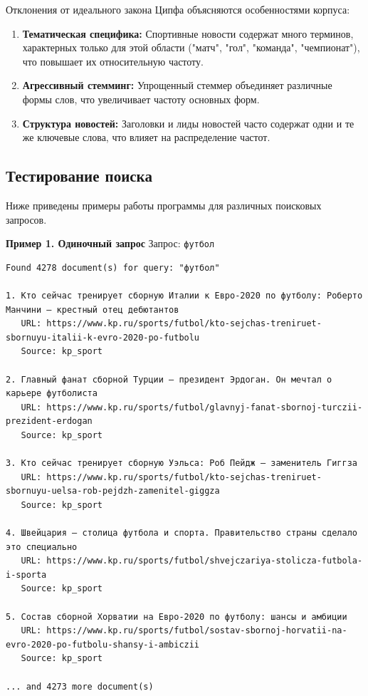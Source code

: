 Отклонения от идеального закона Ципфа объясняются особенностями корпуса:
\begin{enumerate}
    \item \textbf{Тематическая специфика:} Спортивные новости содержат много терминов, характерных только для этой области ("матч", "гол", "команда", "чемпионат"), что повышает их относительную частоту.
    \item \textbf{Агрессивный стемминг:} Упрощенный стеммер объединяет различные формы слов, что увеличивает частоту основных форм.
    \item \textbf{Структура новостей:} Заголовки и лиды новостей часто содержат одни и те же ключевые слова, что влияет на распределение частот.
\end{enumerate}

\subsection{Тестирование поиска}
Ниже приведены примеры работы программы для различных поисковых запросов.

\textbf{Пример 1. Одиночный запрос}
Запрос: \texttt{футбол}
\begin{verbatim}
Found 4278 document(s) for query: "футбол"

1. Кто сейчас тренирует сборную Италии к Евро-2020 по футболу: Роберто Манчини — крестный отец дебютантов
   URL: https://www.kp.ru/sports/futbol/kto-sejchas-treniruet-sbornuyu-italii-k-evro-2020-po-futbolu
   Source: kp_sport

2. Главный фанат сборной Турции – президент Эрдоган. Он мечтал о карьере футболиста
   URL: https://www.kp.ru/sports/futbol/glavnyj-fanat-sbornoj-turczii-prezident-erdogan
   Source: kp_sport

3. Кто сейчас тренирует сборную Уэльса: Роб Пейдж — заменитель Гиггза
   URL: https://www.kp.ru/sports/futbol/kto-sejchas-treniruet-sbornuyu-uelsa-rob-pejdzh-zamenitel-giggza
   Source: kp_sport

4. Швейцария – столица футбола и спорта. Правительство страны сделало это специально
   URL: https://www.kp.ru/sports/futbol/shvejczariya-stolicza-futbola-i-sporta
   Source: kp_sport

5. Состав сборной Хорватии на Евро-2020 по футболу: шансы и амбиции
   URL: https://www.kp.ru/sports/futbol/sostav-sbornoj-horvatii-na-evro-2020-po-futbolu-shansy-i-ambiczii
   Source: kp_sport

... and 4273 more document(s)
\end{verbatim}


